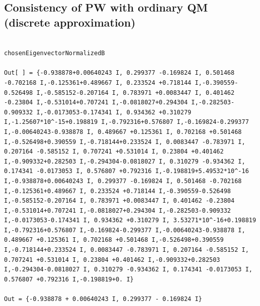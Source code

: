 \subsection{Consistency of PW with ordinary QM (discrete approximation)}

\begin{lstlisting}

chosenEigenvectorNormalizedB 

Out[ ] = {-0.938878+0.00640243 I, 0.299377 -0.169824 I, 0.501468 -0.702168 I,-0.125361+0.489667 I, 0.233524 +0.718144 I,-0.390559-0.526498 I,-0.585152-0.207164 I, 0.783971 +0.0083447 I, 0.401462 -0.23804 I,-0.531014+0.707241 I,-0.0818027+0.294304 I,-0.282503-0.909332 I,-0.0173053-0.174341 I, 0.934362 +0.310279 I,-1.25607*10^-15+0.198819 I,-0.792316+0.576807 I,-0.169824-0.299377 I,-0.00640243-0.938878 I, 0.489667 +0.125361 I, 0.702168 +0.501468 I,-0.526498+0.390559 I,-0.718144+0.233524 I, 0.0083447 -0.783971 I, 0.207164 -0.585152 I, 0.707241 +0.531014 I, 0.23804 +0.401462 I,-0.909332+0.282503 I,-0.294304-0.0818027 I, 0.310279 -0.934362 I, 0.174341 -0.0173053 I, 0.576807 +0.792316 I,-0.198819+5.49532*10^-16 I,-0.938878+0.00640243 I, 0.299377 -0.169824 I, 0.501468 -0.702168 I,-0.125361+0.489667 I, 0.233524 +0.718144 I,-0.390559-0.526498 I,-0.585152-0.207164 I, 0.783971 +0.0083447 I, 0.401462 -0.23804 I,-0.531014+0.707241 I,-0.0818027+0.294304 I,-0.282503-0.909332 I,-0.0173053-0.174341 I, 0.934362 +0.310279 I, 3.53271*10^-16+0.198819 I,-0.792316+0.576807 I,-0.169824-0.299377 I,-0.00640243-0.938878 I, 0.489667 +0.125361 I, 0.702168 +0.501468 I,-0.526498+0.390559 I,-0.718144+0.233524 I, 0.0083447 -0.783971 I, 0.207164 -0.585152 I, 0.707241 +0.531014 I, 0.23804 +0.401462 I,-0.909332+0.282503 I,-0.294304-0.0818027 I, 0.310279 -0.934362 I, 0.174341 -0.0173053 I, 0.576807 +0.792316 I,-0.198819+0. I}

Out = {-0.938878 + 0.00640243 I, 0.299377 - 0.169824 I}
\end{lstlisting}